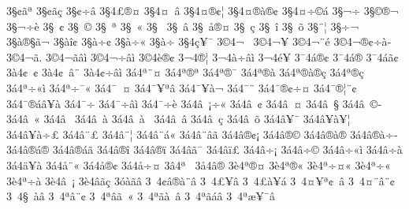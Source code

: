 {3^^a7^^a2^^e3^^aa
3^^a7^^a2^^e3^^e7
3^^a7^^a2^^f7^^e2     
3^^a74^^a3^^ae^^a4     
3^^a74^^a4^^a0^^e2
3^^a74^^a4^^ae^^a2^^a6
3^^a74^^a4^^ae^^e0^^ae^^a2
3^^a74^^a4^^f7^^a9^^e1^^ad
3^^a7^^ac^^f7^^ad
3^^a7^^a9^^ae^^ac
3^^a7^^ac^^f7^^e8
3^^a7^^ad^^a0^^a2
3^^a7^^ad^^a0^^a9
3^^a7^^ad^^a0^^aa
3^^a7^^ad^^a0^^ab
3^^a7^^ad^^a0^^ad
3^^a7^^ad^^a0^^e2
3^^a7^^ad^^a0^^e5^^ae^^a4
3^^a7^^ad^^a0^^e7
3^^a7^^ad^^a0^^ee
3^^a7^^ad^^a0^^f5
3^^a7^^ad^^a8^^a6
3^^a7^^ad^^f7^^ac
3^^a7^^e0^^ae^^a7^^e3^^ac
3^^a7^^e0^^ee^^a2 
3^^a7^^e0^^f7^^a2 
3^^a7^^e0^^f7^^ab 
3^^a7^^e0^^f7^^ad 
3^^a74^^e7^^a5^^af
3^^a94^^ac^^a0
3^^a94^^ac^^a5^^ad^^ad
3^^a94^^ac^^a8^^e9
3^^a94^^ac^^ae^^a2^^f7^^e0^^ad
3^^a94^^ac^^e3.
3^^a94^^ac^^e3^^e2^^ec
3^^a94^^ac^^f7^^e2^^ec
3^^a94^^e8^^ae^^a2
3^^ac4^^ad^^ae^^a6
3^^ac4^^e0^^f7^^e2^^ec
3^^ac4^^e9^^a5^^ad
3^^af4^^e1^^ae^^a2
3^^af4^^e1^^ae^^ad
3^^af4^^e1^^e3^^a2
3^^e04^^a2^^a0^^a2
3^^e04^^a2^^a0^^e2^^a8
3^^e04^^a2^^f7^^e2^^ec
3^^e14^^aa^^a8^^a4
3^^e14^^aa^^ae^^aa
3^^e14^^aa^^ae^^af     
3^^e14^^aa^^ae^^e0
3^^e14^^aa^^ae^^e0^^ae^^e7
3^^e14^^aa^^ae^^e7     
3^^e14^^aa^^f7^^ab^^ec
3^^e14^^aa^^f7^^af^^ab
3^^e14^^af^^a0^^a4
3^^e14^^af^^a5^^aa^^e2
3^^e14^^af^^a5^^e0^^ac
3^^e14^^af^^a8^^ad
3^^e14^^af^^ae^^a2^^f7^^a4
3^^e14^^af^^ae^^a6^^a8^^a2
3^^e14^^af^^ae^^e1^^e2^^a5^^e0
3^^e14^^af^^f7
3^^e14^^af^^f7^^e2^^ec
3^^e14^^af^^f7^^e8
3^^e14^^e2^^a0^^a1^^f7^^ab 
3^^e14^^e2^^a0^^a2 
3^^e14^^e2^^a0^^a4 
3^^e14^^e2^^a0^^a7
3^^e14^^e2^^a0^^a9^^ad
3^^e14^^e2^^a0^^ab
3^^e14^^e2^^a0^^ad
3^^e14^^e2^^a0^^e0
3^^e14^^e2^^a0^^e0^^a0
3^^e14^^e2^^a0^^e2
3^^e14^^e2^^a0^^e7
3^^e14^^e2^^a0^^f5
3^^e14^^e2^^a5^^af     
3^^e14^^e2^^a5^^e0^^a5^^a6
3^^e14^^e2^^a5^^e0^^f7^^a3
3^^e14^^e2^^a8^^a3
3^^e14^^e2^^a8^^a6
3^^e14^^e2^^a8^^e1^^ab
3^^e14^^e2^^a8^^e2^^e3
3^^e14^^e2^^ae^^a2^^a1 
3^^e14^^e2^^ae^^a9
3^^e14^^e2^^ae^^e0^^ae^^ad
3^^e14^^e2^^ae^^e0^^f7^^ad
3^^e14^^e2^^ae^^e1^^ae
3^^e14^^e2^^ae^^e1^^e3
3^^e14^^e2^^ae^^ee
3^^e14^^e2^^ae^^ef^^ad 
3^^e14^^e2^^e3^^af
3^^e14^^e2^^ef^^a3
3^^e14^^e2^^f7^^a1
3^^e14^^e2^^f7^^a9
3^^e14^^e2^^f7^^ab^^ec
3^^e14^^e2^^f7^^e0
3^^e14^^e4^^a5^^e0
3^^e14^^e5^^a8^^ab
3^^e14^^e5^^ae^^a2
3^^e14^^e5^^f7^^a4
3^^e24^^aa^^a0^^ad
3^^e54^^e2^^ae
3^^e84^^aa^^ae^^a4
3^^e84^^aa^^ae^^ab
3^^e84^^aa^^f7^^a4^^ab
3^^e84^^aa^^f7^^ab
3^^e84^^aa^^f7^^e0
3^^e84^^e2^^a0^^a1
3^^e84^^e2^^e3^^e7
3^^f3^^e0^^e3^^ad^^e2
3^^a04^^a2^^e2^^ae^^e0^^a8^^e2
3^^a04^^a3^^a5^^ad^^e2
3^^a04^^a3^^e0^^a5^^e1
3^^a04^^a4^^a5^^aa^^a2^^a0^^e2
3^^a04^^a4^^a8^^e2^^a8^^a2
3^^a04^^a7^^a0^^e0^^e2
3^^a04^^aa^^e2^^a8^^a2
3^^a04^^aa^^e2^^e3^^a0^^ab
3^^a04^^aa^^e3^^e0^^a0^^e2
3^^a04^^aa^^e3^^e1^^e2
3^^a04^^aa^^e6^^a5^^af^^e2
}
